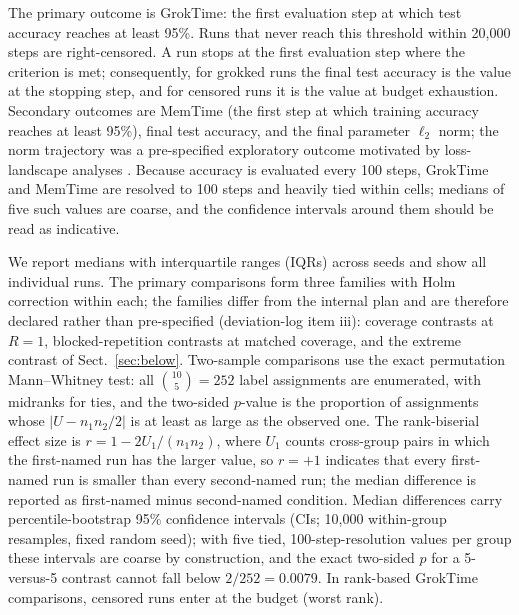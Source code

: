 \documentclass[10pt]{article}
\newcommand{\groktime}{GrokTime}
\newcommand{\memtime}{MemTime}
\begin{document}
The primary outcome is \groktime{}: the first evaluation step at which test accuracy reaches at least 95\%. Runs that never reach this threshold within 20{,}000 steps are right-censored. A run stops at the first evaluation step where the criterion is met; consequently, for grokked runs the final test accuracy is the value at the stopping step, and for censored runs it is the value at budget exhaustion. Secondary outcomes are \memtime{} (the first step at which training accuracy reaches at least 95\%), final test accuracy, and the final parameter $\ell_2$ norm; the norm trajectory was a pre-specified exploratory outcome motivated by loss-landscape analyses \citep{liu2023omnigrok}. Because accuracy is evaluated every 100 steps, \groktime{} and \memtime{} are resolved to 100 steps and heavily tied within cells; medians of five such values are coarse, and the confidence intervals around them should be read as indicative.

We report medians with interquartile ranges (IQRs) across seeds and show all individual runs. The primary comparisons form three families with Holm correction within each; the families differ from the internal plan and are therefore declared rather than pre-specified (deviation-log item iii): coverage contrasts at $R=1$, blocked-repetition contrasts at matched coverage, and the extreme contrast of Sect.~\ref{sec:below}. Two-sample comparisons use the exact permutation Mann--Whitney test: all $\binom{10}{5} = 252$ label assignments are enumerated, with midranks for ties, and the two-sided $p$-value is the proportion of assignments whose $|U - n_1 n_2 / 2|$ is at least as large as the observed one. The rank-biserial effect size is $r = 1 - 2U_1/(n_1 n_2)$, where $U_1$ counts cross-group pairs in which the first-named run has the larger value, so $r = +1$ indicates that every first-named run is smaller than every second-named run; the median difference is reported as first-named minus second-named condition. Median differences carry percentile-bootstrap 95\% confidence intervals (CIs; 10{,}000 within-group resamples, fixed random seed); with five tied, 100-step-resolution values per group these intervals are coarse by construction, and the exact two-sided $p$ for a 5-versus-5 contrast cannot fall below $2/252 = 0.0079$. In rank-based \groktime{} comparisons, censored runs enter at the budget (worst rank).
\end{document}
